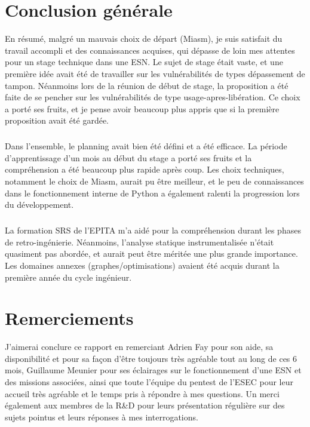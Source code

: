 \section{Conclusion générale}
En résumé, malgré un mauvais choix de départ (Miasm), je suis satisfait du travail accompli et des connaissances acquises, qui dépasse de loin mes attentes pour un stage technique dans une ESN.
Le sujet de stage était vaste, et une première idée avait été de travailler sur les vulnérabilités de types dépassement de tampon. Néanmoins lors de la réunion de début de stage, la proposition a été
faite de se pencher sur les vulnérabilités de type usage-apres-libération. Ce choix a porté ses fruits, et je pense avoir beaucoup plus appris que si la première proposition avait été gardée.
\subparagraph{}
Dans l'ensemble, le planning avait bien été défini et a été efficace. La période d'apprentissage d'un mois au début du stage a porté ses fruits et la compréhension a été beaucoup plus rapide
après coup. Les choix techniques, notamment le choix de Miasm, aurait pu être meilleur, et le peu de connaissances dans le fonctionnement interne de Python a également ralenti la progression
lors du développement.
\subparagraph{}
La formation SRS de l'EPITA m'a aidé pour la compréhension durant les phases de retro-ingénierie. Néanmoins, l'analyse statique instrumentalisée n'était quasiment pas abordée, et aurait peut être
méritée une plus grande importance. Les domaines annexes (graphes/optimisations) avaient été acquis durant la première année du cycle ingénieur.

\section{Remerciements}
J'aimerai conclure ce rapport en remerciant Adrien Fay pour son aide, sa disponibilité et pour sa façon d'être toujours très agréable tout au long de ces 6 mois,
Guillaume Meunier pour ses éclairages sur le fonctionnement d'une ESN et des missions associées, ainsi que toute l'équipe du pentest de l'ESEC pour leur accueil très agréable et le temps
pris à répondre à mes questions. Un merci également aux membres de la R\&D pour leurs présentation régulière sur des sujets pointus et leurs réponses à mes interrogations.
